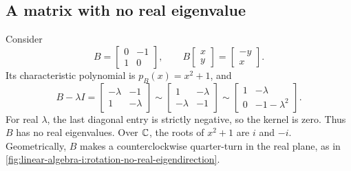 \subsection{A matrix with no real eigenvalue}

\begin{example}
  \label{ex:linear-algebra-i:rotation-no-real-eigenvalue}
  Consider
  \[
    B=\begin{bmatrix}0&-1\\1&0\end{bmatrix},\qquad
    B\begin{bmatrix}x\\y\end{bmatrix}=\begin{bmatrix}-y\\x\end{bmatrix}.
  \]
  Its characteristic polynomial is \(p_B(x)=x^2+1\), and
  \[
    B-\lambda I=
    \begin{bmatrix}-\lambda&-1\\1&-\lambda\end{bmatrix}
    \sim\begin{bmatrix}1&-\lambda\\-\lambda&-1\end{bmatrix}
    \sim\begin{bmatrix}1&-\lambda\\0&-1-\lambda^2\end{bmatrix}.
  \]
  For real \(\lambda\), the last diagonal entry is strictly negative,
  so the kernel is zero. Thus \(B\) has no real eigenvalues.
  Over \(\mathbb{C}\), the roots of \(x^2+1\) are \(i\) and \(-i\).
  Geometrically, \(B\) makes a counterclockwise quarter-turn in the
  real plane, as in
  \autoref{fig:linear-algebra-i:rotation-no-real-eigendirection}.
  \begin{marginfigure}
    \centering
    
    \caption[A quarter-turn in the real plane]{For every real nonzero
      \(v\), the vector \(Bv\) is perpendicular to \(v\), so it cannot
      be a real scalar multiple of \(v\).}
    \label{fig:linear-algebra-i:rotation-no-real-eigendirection}
  \end{marginfigure}
\end{example}
